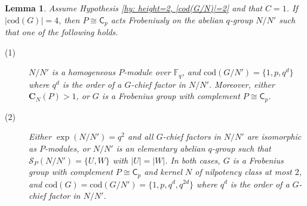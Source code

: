 \documentclass[9pt]{article}
\newtheorem{lem}{\bf Lemma}[section]
\begin{document}
\begin{lem}\label{lem: height=2, |cod(G/N)|=2, C=1, Frob}
	Assume Hypothesis \ref{hy: height=2, |cod(G/N)|=2} and that $C=1$.
	If $|\mathrm{cod}(G)|=4$, then 
	$P\cong \mathsf{C}_{p}$ acts Frobeniusly on the abelian $q$-group
    $N/N'$ 
	such that one of the following holds.
	\begin{description}
		\item[(1)] $N/N'$ is a homogeneous $P$-module over $\mathbb{F}_q$, and $\mathrm{cod}(G/N')=\{ 1,p,q^{d} \}$ where $q^{d}$ is the order of a $G$-chief factor in $N/N'$.
		Moreover, either $\mathbf{C}_{N}(P)>1$, or $G$ is a Frobenius group with complement $P\cong \mathsf{C}_{p}$.
		\item[(2)] Either $\exp(N/N')= q^{2}$ and all $G$-chief factors in $N/N'$ are isomorphic as $P$-modules, or $N/N'$ is an elementary abelian $q$-group such that $\mathcal{S}_{P}(N/N')=\{ U,W \}$ with $|U|=|W|$. 
		In both cases, $G$ is a Frobenius group with complement $P\cong \mathsf{C}_{p}$ 
		and kernel $N$ of nilpotency class at most $2$, and 
		$\mathrm{cod}(G)=\mathrm{cod}(G/N')=\{ 1,p,q^{d},q^{2d} \}$ where $q^{d}$ is the order of a $G$-chief factor in $N/N'$.
	\end{description}
\end{lem}
\end{document}

